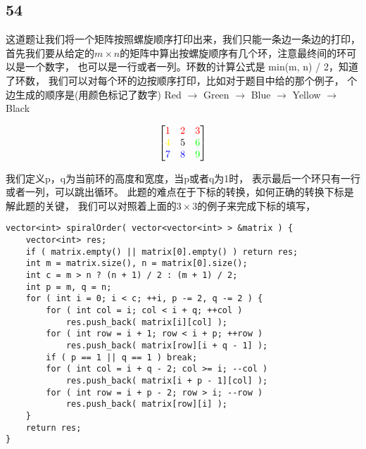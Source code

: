 \documentclass[12pt,a4paper]{article}
\begin{document}
\subsection{54}
\begin{CJK}{UTF8}{gbsn}
这道题让我们将一个矩阵按照螺旋顺序打印出来，我们只能一条边一条边的打印，
首先我们要从给定的$m \times n$的矩阵中算出按螺旋顺序有几个环，注意最终间的环可以是一个数字，
也可以是一行或者一列。环数的计算公式是 min(m, n) / 2，知道了环数，
我们可以对每个环的边按顺序打印，比如对于题目中给的那个例子，
个边生成的顺序是(用颜色标记了数字) Red $\rightarrow$ Green $\rightarrow$ Blue $\rightarrow$ Yellow $\rightarrow$ Black
\end{CJK}
\[
\begin{bmatrix}
	\textcolor{red}{1} & \textcolor{red}{2} & \textcolor{red}{3} \\
	\textcolor{yellow}{4} & 5 & \textcolor{green}{6} \\
	\textcolor{blue}{7} & \textcolor{blue}{8} & \textcolor{green}{9}
\end{bmatrix}
\]
\begin{CJK}{UTF8}{gbsn}
我们定义p，q为当前环的高度和宽度，当p或者q为1时，
表示最后一个环只有一行或者一列，可以跳出循环。
此题的难点在于下标的转换，如何正确的转换下标是解此题的关键，
我们可以对照着上面的$3\times3$的例子来完成下标的填写，
\end{CJK}
\begin{lstlisting}
vector<int> spiralOrder( vector<vector<int> > &matrix ) {
	vector<int> res;
	if ( matrix.empty() || matrix[0].empty() ) return res;
	int m = matrix.size(), n = matrix[0].size();
	int c = m > n ? (n + 1) / 2 : (m + 1) / 2;
	int p = m, q = n;
	for ( int i = 0; i < c; ++i, p -= 2, q -= 2 ) {
		for ( int col = i; col < i + q; ++col )
			res.push_back( matrix[i][col] );
		for ( int row = i + 1; row < i + p; ++row )
			res.push_back( matrix[row][i + q - 1] );
		if ( p == 1 || q == 1 ) break;
		for ( int col = i + q - 2; col >= i; --col )
			res.push_back( matrix[i + p - 1][col] );
		for ( int row = i + p - 2; row > i; --row )
			res.push_back( matrix[row][i] );
	}
	return res;
}
\end{lstlisting}
\end{document}
